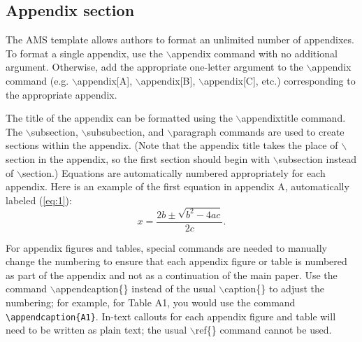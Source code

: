 \documentclass{ametsoc}
\begin{document}
 \appendix[A] 



\subsection{Appendix section}

The AMS template allows authors to format an unlimited number of
appendixes. To format a single appendix, use the $\backslash$appendix
command with no additional argument. Otherwise, add the appropriate
one-letter argument to the $\backslash$appendix command (e.g.
$\backslash$appendix[A], $\backslash$appendix[B],
$\backslash$appendix[C], etc.) corresponding to the appropriate
appendix. 


The title of the appendix can be formatted using the
$\backslash$appendixtitle{\tt\string{\string}} 
 command. The $\backslash$subsection, $\backslash$subsubection,
and $\backslash$paragraph commands are used to create sections within
the appendix. (Note that the appendix title takes the place of $\backslash$section 
in the appendix, so the first section should begin with $\backslash$subsection
instead of $\backslash$section.)
 Equations are automatically numbered appropriately for 
each appendix. Here is an example of the first equation in appendix
A, automatically labeled (\ref{eq:1}): 
\begin{equation} \label{eq:1}
x=\frac{2b\pm\sqrt{b^{2}-4ac}}{2c}.  
\end{equation}

For appendix figures and tables, special commands are needed to manually 
change the numbering to ensure that each appendix figure or table is numbered 
as part of the appendix and not as a continuation of the main paper. Use the command
$\backslash$appendcaption\{\} instead of the usual $\backslash$caption\{\} to adjust the 
numbering; for example, for Table A1, you would use the command \verb+\appendcaption{A1}+.
In-text callouts for each appendix figure and table will need to be written as plain text;
the usual $\backslash$ref\{\} command cannot be used.

%
%
%
\end{document}
